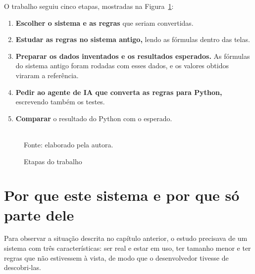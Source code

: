 O trabalho seguiu cinco etapas, mostradas na Figura~\ref{fig:etapas}:

\begin{enumerate}
    \item \textbf{Escolher o sistema e as regras} que seriam convertidas.
    \item \textbf{Estudar as regras no sistema antigo,} lendo as fórmulas dentro das telas.
    \item \textbf{Preparar os dados inventados e os resultados esperados.} As fórmulas do sistema antigo foram rodadas com esses dados, e os valores obtidos viraram a referência.
    \item \textbf{Pedir ao agente de IA que converta as regras para Python,} escrevendo também os testes.
    \item \textbf{Comparar} o resultado do Python com o esperado.
\end{enumerate}

\begin{figure}[htbp]
\centering
\caption{Etapas do trabalho}
\label{fig:etapas}
\\[2pt]
\footnotesize Fonte: elaborado pela autora.
\end{figure}

\section{Por que este sistema e por que só parte dele}
\label{sec:escolha-sistema}

Para observar a situação descrita no capítulo anterior, o estudo precisava de um sistema com três características: ser real e estar em uso, ter tamanho menor e ter regras que não estivessem à vista, de modo que o desenvolvedor tivesse de descobri-las.

